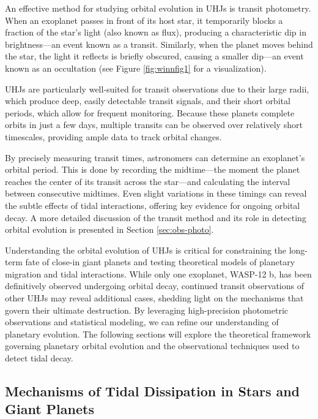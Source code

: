 \documentclass[oneside,12pt]{amsart}
\numberwithin{page}{section}
\begin{document}
An effective method for studying orbital evolution in UHJs is transit photometry. When an exoplanet passes in front of its host star, it temporarily blocks a fraction of the star’s light (also known as flux), producing a characteristic dip in brightness—an event known as a transit. Similarly, when the planet moves behind the star, the light it reflects is briefly obscured, causing a smaller dip—an event known as an occultation (see Figure \ref{fig:winnfig1} for a visualization).

UHJs are particularly well-suited for transit observations due to their large radii, which produce deep, easily detectable transit signals, and their short orbital periods, which allow for frequent monitoring. Because these planets complete orbits in just a few days, multiple transits can be observed over relatively short timescales, providing ample data to track orbital changes.

By precisely measuring transit times, astronomers can determine an exoplanet’s orbital period. This is done by recording the midtime—the moment the planet reaches the center of its transit across the star—and calculating the interval between consecutive midtimes. Even slight variations in these timings can reveal the subtle effects of tidal interactions, offering key evidence for ongoing orbital decay. A more detailed discussion of the transit method and its role in detecting orbital evolution is presented in Section \ref{sec:obs-photo}.

Understanding the orbital evolution of UHJs is critical for constraining the long-term fate of close-in giant planets and testing theoretical models of planetary migration and tidal interactions. While only one exoplanet, WASP-12 b, has been definitively observed undergoing orbital decay, continued transit observations of other UHJs may reveal additional cases, shedding light on the mechanisms that govern their ultimate destruction. By leveraging high-precision photometric observations and statistical modeling, we can refine our understanding of planetary evolution. The following sections will explore the theoretical framework governing planetary orbital evolution and the observational techniques used to detect tidal decay.

\clearpage



\subsection{Mechanisms of Tidal Dissipation in Stars and Giant Planets}\label{sec:tidaldissipation}
\end{document}
